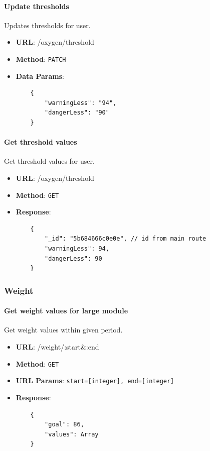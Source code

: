         \paragraph{Update thresholds} Updates thresholds for user.
        \begin{itemize}
            \item \textbf{URL}: /oxygen/threshold
            \item \textbf{Method}: \texttt{PATCH}
            \item \textbf{Data Params}: \begin{verbatim}
    {
        "warningLess": "94",
        "dangerLess": "90"
    }  
            \end{verbatim}
        \end{itemize}

        \paragraph{Get threshold values} Get threshold values for user.
        \begin{itemize}
            \item \textbf{URL}: /oxygen/threshold
            \item \textbf{Method}: \texttt{GET}
            \item \textbf{Response}: \begin{verbatim}
    {
        "_id": "5b684666c0e0e", // id from main route
        "warningLess": 94,
        "dangerLess": 90
    }
            \end{verbatim}
        \end{itemize}

    \subsubsection{Weight}

        \paragraph{Get weight values for large module} Get weight values within given period.
        \begin{itemize}
            \item \textbf{URL}: /weight/:start\&:end
            \item \textbf{Method}: \texttt{GET}
            \item \textbf{URL Params}: \texttt{start=[integer], end=[integer]}
            \item \textbf{Response}: \begin{verbatim}
    {
        "goal": 86,
        "values": Array
    }
            \end{verbatim}
        \end{itemize}

